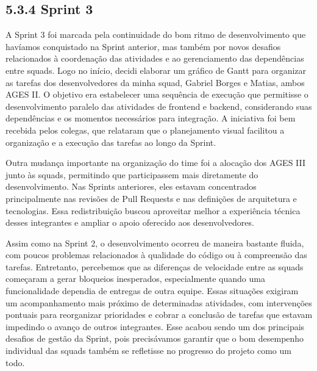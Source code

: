 \hypertarget{__RefHeading___Toc4851_3118176633}{}
\subsection*{5.3.4 Sprint 3}
\label{ages-iv:text-h-0120}

\indent A Sprint 3 foi marcada pela continuidade do bom ritmo de desenvolvimento que havíamos conquistado na Sprint anterior, mas também por novos desafios relacionados à coordenação das atividades e ao gerenciamento das dependências entre squads. Logo no início, decidi elaborar um gráfico de Gantt para organizar as tarefas dos desenvolvedores da minha squad, Gabriel Borges e Matias, ambos AGES II. O objetivo era estabelecer uma sequência de execução que permitisse o desenvolvimento paralelo das atividades de frontend e backend, considerando suas dependências e os momentos necessários para integração. A iniciativa foi bem recebida pelos colegas, que relataram que o planejamento visual facilitou a organização e a execução das tarefas ao longo da Sprint.\par


\indent Outra mudança importante na organização do time foi a alocação dos AGES III junto às squads, permitindo que participassem mais diretamente do desenvolvimento. Nas Sprints anteriores, eles estavam concentrados principalmente nas revisões de Pull Requests e nas definições de arquitetura e tecnologias. Essa redistribuição buscou aproveitar melhor a experiência técnica desses integrantes e ampliar o apoio oferecido aos desenvolvedores.\par

\indent Assim como na Sprint 2, o desenvolvimento ocorreu de maneira bastante fluida, com poucos problemas relacionados à qualidade do código ou à compreensão das tarefas. Entretanto, percebemos que as diferenças de velocidade entre as squads começaram a gerar bloqueios inesperados, especialmente quando uma funcionalidade dependia de entregas de outra equipe. Essas situações exigiram um acompanhamento mais próximo de determinadas atividades, com intervenções pontuais para reorganizar prioridades e cobrar a conclusão de tarefas que estavam impedindo o avanço de outros integrantes. Esse acabou sendo um dos principais desafios de gestão da Sprint, pois precisávamos garantir que o bom desempenho individual das squads também se refletisse no progresso do projeto como um todo.\par

